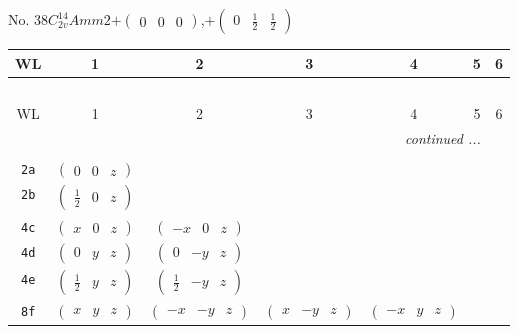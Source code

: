 \documentclass[fleqn,9pt,landscape]{jsarticle}
\begin{document}
\newpage
No. 38\quad$C_{2v}^{14}$\quad$Amm2$\quad[ orthorhombic ]\quad$+\begin{pmatrix} 0 & 0 & 0 \end{pmatrix}$,\quad $+\begin{pmatrix} 0 & \frac{1}{2} & \frac{1}{2} \end{pmatrix}$
\begin{center}
\renewcommand{\arraystretch}{1.2}
\begin{longtable}{ccccccc}
 \hline \hline
WL & 1 & 2 & 3 & 4 & 5 & 6 \\ \hline \endfirsthead

\multicolumn{6}{l}{\tablename\ \thetable{}} \\
 \hline \hline
WL & 1 & 2 & 3 & 4 & 5 & 6 \\ \hline \endhead

 \hline \hline
\multicolumn{6}{r}{\footnotesize\it continued ...} \\ \endfoot

 \hline \hline
\multicolumn{6}{r}{} \\ \endlastfoot

{\tt 2a} & $ \begin{pmatrix} 0 & 0 & z \end{pmatrix} $ & $  $ & $  $ & $  $ \\ \hline
{\tt 2b} & $ \begin{pmatrix} \frac{1}{2} & 0 & z \end{pmatrix} $ & $  $ & $  $ & $  $ \\ \hline
{\tt 4c} & $ \begin{pmatrix} x & 0 & z \end{pmatrix} $ & $ \begin{pmatrix} - x & 0 & z \end{pmatrix} $ & $  $ & $  $ \\ \hline
{\tt 4d} & $ \begin{pmatrix} 0 & y & z \end{pmatrix} $ & $ \begin{pmatrix} 0 & - y & z \end{pmatrix} $ & $  $ & $  $ \\ \hline
{\tt 4e} & $ \begin{pmatrix} \frac{1}{2} & y & z \end{pmatrix} $ & $ \begin{pmatrix} \frac{1}{2} & - y & z \end{pmatrix} $ & $  $ & $  $ \\ \hline
{\tt 8f} & $ \begin{pmatrix} x & y & z \end{pmatrix} $ & $ \begin{pmatrix} - x & - y & z \end{pmatrix} $ & $ \begin{pmatrix} x & - y & z \end{pmatrix} $ & $ \begin{pmatrix} - x & y & z \end{pmatrix} $ \\
\end{longtable}
\end{center}
\end{document}
